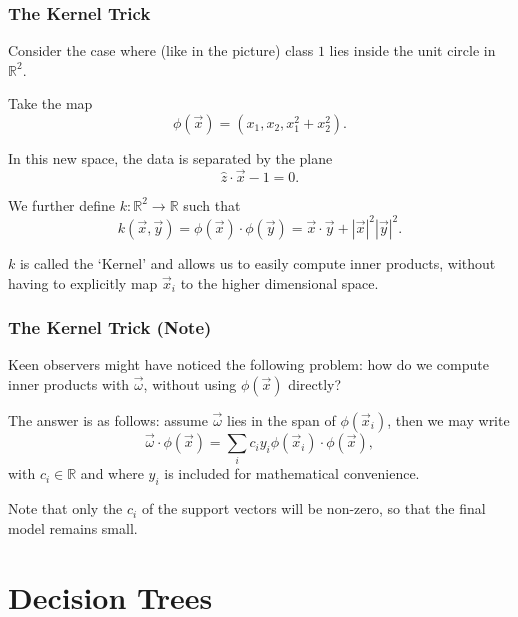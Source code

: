 \documentclass[mathserif,serif]{beamer}
\begin{document}
\begin{frame}
  \frametitle{The Kernel Trick}
  Consider the case where (like in the picture) class $1$ lies inside the unit circle in $\mathbb{R}^2$.

  \pause
  Take the map
  \begin{equation}
    \phi(\vec x) = (x_1, x_2, x_1^2+x_2^2).
  \end{equation}

  \pause
  In this new space, the data is separated by the plane
  \begin{equation}
    \hat z \cdot \vec x - 1 = 0.
  \end{equation}

  \pause
  We further define $k: \mathbb{R}^2 \to \mathbb{R}$ such that
  \begin{equation}
    k(\vec x, \vec y) = \phi(\vec x) \cdot \phi(\vec y) = \vec x \cdot \vec y + |\vec x|^2 |\vec y|^2.
  \end{equation}

  \pause
  $k$ is called the `Kernel' and allows us to easily compute inner products, without having to
  explicitly map $\vec x_i$ to the higher dimensional space.

\end{frame}

\begin{frame}
  \frametitle{The Kernel Trick (Note)}

  Keen observers might have noticed the following problem: how do we compute inner products with
  $\vec\omega$, without using $\phi(\vec x)$ directly?

  \pause
  The answer is as follows: assume $\vec\omega$ lies in the span of $\phi(\vec x_i)$, then we may
  write
  \begin{equation}
    \vec\omega \cdot \phi(\vec x) = \sum_i c_i y_i \phi(\vec x_i) \cdot \phi(\vec x),
  \end{equation}
  with $c_i \in \mathbb{R}$ and where $y_i$ is included for mathematical convenience.

  \pause
  Note that only the $c_i$ of the support vectors will be non-zero, so that the final model
  remains small.
\end{frame}

\section{Decision Trees}
\frame{\sectionpage}
\end{document}
